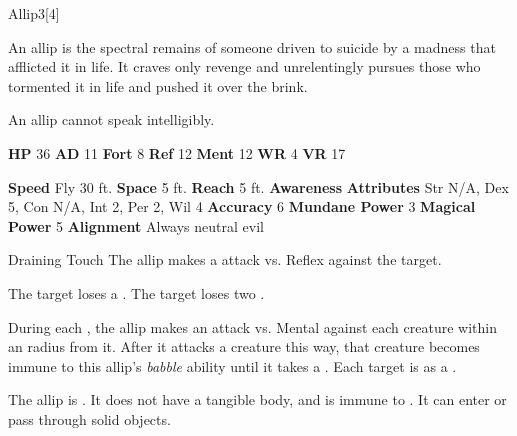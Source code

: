       
  \begin{monsection}{Allip}{3}[4]
    \vspace{-1em}\vspace{-1em}
    \vspace{0em}

    
      An allip is the spectral remains of someone driven to suicide by a madness that afflicted it in life.
      It craves only revenge and unrelentingly pursues those who tormented it in life and pushed it over the brink.

      An allip cannot speak intelligibly.
    
    

    \begin{spellcontent}
      \begin{spelltargetinginfo}
        \pari \textbf{HP} 36 \monsep
          \textbf{AD} 11 \monsep
          \textbf{Fort} 8 \monsep
          \textbf{Ref} 12 \monsep
          \textbf{Ment} 12
        \pari \textbf{WR} 4 \monsep
        \textbf{VR} 17
        
      \end{spelltargetinginfo}
    \end{spellcontent}
    \begin{monsterfooter}
      \pari \textbf{Speed} Fly 30 ft. \monsep
        \textbf{Space} 5 ft. \monsep
        \textbf{Reach} 5 ft.
      \pari \textbf{Awareness} 
      \pari \textbf{Attributes}
        Str N/A, Dex 5,
        Con N/A, Int 2,
        Per 2, Wil 4
      \pari \textbf{Accuracy} 6 \monsep
        \textbf{Mundane Power} 3 \monsep
      \textbf{Magical Power} 5
      \pari \textbf{Alignment} Always neutral evil
    \end{monsterfooter}
  \end{monsection}
  \begin{freeability}{Draining Touch}
       The allip makes a  attack
        vs. Reflex against the target.
    
    \hit The target loses a .
    \crit The target loses two .
    \end{freeability}
  
      
          During each , the allip makes an attack vs. Mental against each creature
          within an \arealarge radius  from it.
          After it attacks a creature this way, that creature becomes immune to this allip's \textit{babble} ability until it takes a .
          \hit Each target is  as a .
        
      The allip is .
      It does not have a tangible body, and is immune to .
      It can enter or pass through solid objects.
  